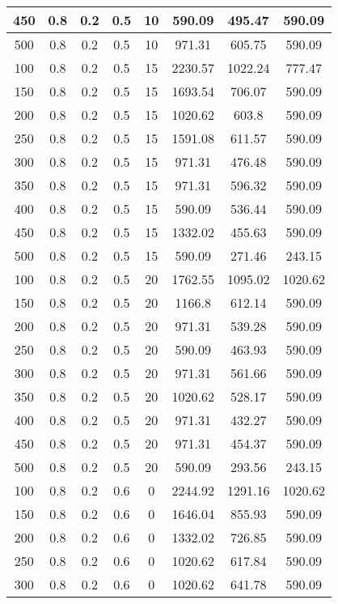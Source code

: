 \documentclass[a4paper, 12pt]{extreport}
\begin{document}
\begin{itemize}
\begin{longtable}{|c|c|c|c|c|c|c|c|}
			450 & 0.8 & 0.2 & 0.5 & 10 & 590.09 & 495.47 & 590.09 \\\hline
			500 & 0.8 & 0.2 & 0.5 & 10 & 971.31 & 605.75 & 590.09 \\\hline
			100 & 0.8 & 0.2 & 0.5 & 15 & 2230.57 & 1022.24 & 777.47 \\\hline
			150 & 0.8 & 0.2 & 0.5 & 15 & 1693.54 & 706.07 & 590.09 \\\hline
			200 & 0.8 & 0.2 & 0.5 & 15 & 1020.62 & 603.8 & 590.09 \\\hline
			250 & 0.8 & 0.2 & 0.5 & 15 & 1591.08 & 611.57 & 590.09 \\\hline
			300 & 0.8 & 0.2 & 0.5 & 15 & 971.31 & 476.48 & 590.09 \\\hline
			350 & 0.8 & 0.2 & 0.5 & 15 & 971.31 & 596.32 & 590.09 \\\hline
			400 & 0.8 & 0.2 & 0.5 & 15 & 590.09 & 536.44 & 590.09 \\\hline
			450 & 0.8 & 0.2 & 0.5 & 15 & 1332.02 & 455.63 & 590.09 \\\hline
			500 & 0.8 & 0.2 & 0.5 & 15 & 590.09 & 271.46 & 243.15 \\\hline
			100 & 0.8 & 0.2 & 0.5 & 20 & 1762.55 & 1095.02 & 1020.62 \\\hline
			150 & 0.8 & 0.2 & 0.5 & 20 & 1166.8 & 612.14 & 590.09 \\\hline
			200 & 0.8 & 0.2 & 0.5 & 20 & 971.31 & 539.28 & 590.09 \\\hline
			250 & 0.8 & 0.2 & 0.5 & 20 & 590.09 & 463.93 & 590.09 \\\hline
			300 & 0.8 & 0.2 & 0.5 & 20 & 971.31 & 561.66 & 590.09 \\\hline
			350 & 0.8 & 0.2 & 0.5 & 20 & 1020.62 & 528.17 & 590.09 \\\hline
			400 & 0.8 & 0.2 & 0.5 & 20 & 971.31 & 432.27 & 590.09 \\\hline
			450 & 0.8 & 0.2 & 0.5 & 20 & 971.31 & 454.37 & 590.09 \\\hline
			500 & 0.8 & 0.2 & 0.5 & 20 & 590.09 & 293.56 & 243.15 \\\hline
			100 & 0.8 & 0.2 & 0.6 & 0 & 2244.92 & 1291.16 & 1020.62 \\\hline
			150 & 0.8 & 0.2 & 0.6 & 0 & 1646.04 & 855.93 & 590.09 \\\hline
			200 & 0.8 & 0.2 & 0.6 & 0 & 1332.02 & 726.85 & 590.09 \\\hline
			250 & 0.8 & 0.2 & 0.6 & 0 & 1020.62 & 617.84 & 590.09 \\\hline
			300 & 0.8 & 0.2 & 0.6 & 0 & 1020.62 & 641.78 & 590.09 \\\hline

\end{longtable}
\end{itemize}
\end{document}
